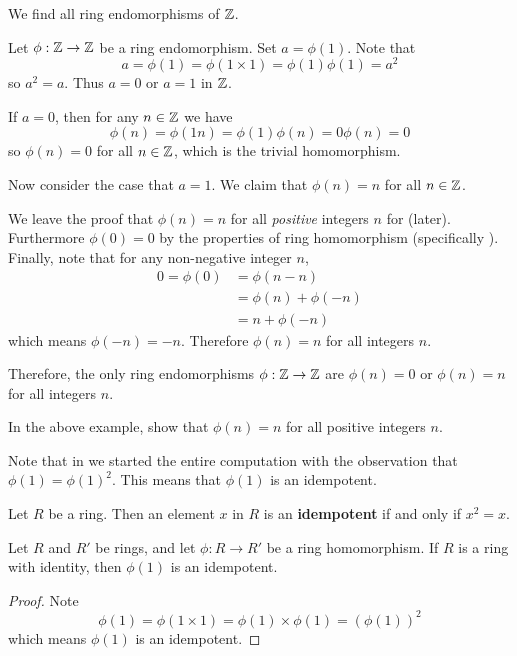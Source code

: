 \begin{example}\label{example-endomorphisms-of-Z}
    We find all ring endomorphisms of $\mathbb{Z}$.

    Let $\phi:\mathbb{Z}\to\mathbb{Z}$ be a ring endomorphism. Set $a = \phi(1)$. Note that
    \[
        a = \phi(1) = \phi(1\times1) = \phi(1)\phi(1) = a^2
    \]
    so $a^2 = a$. Thus $a = 0$ or $a = 1$ in $\mathbb{Z}$.

    If $a = 0$, then for any $n \in \mathbb{Z}$ we have
    \[
        \phi(n) = \phi(1n) = \phi(1)\phi(n) = 0\phi(n) = 0
    \]
    so $\phi(n) = 0$ for all $n \in \mathbb{Z}$, which is the trivial homomorphism.

    Now consider the case that $a = 1$. We claim that $\phi(n) = n$ for all $n \in \mathbb{Z}$.

    We leave the proof that $\phi(n) = n$ for all \textit{positive} integers $n$ for  (later). Furthermore $\phi(0) = 0$ by the properties of ring homomorphism (specifically ). Finally, note that for any non-negative integer $n$,
    \begin{align*}
        0 = \phi(0) &= \phi(n - n)\\
        &= \phi(n) + \phi(-n)\\
        &= n + \phi(-n)
    \end{align*}
    which means $\phi(-n) = -n$. Therefore $\phi(n) = n$ for all integers $n$.

    Therefore, the only ring endomorphisms $\phi:\mathbb{Z}\to\mathbb{Z}$ are $\phi(n) = 0$ or $\phi(n) = n$ for all integers $n$.
\end{example}
\begin{exercise}\label{exercise-homomorphism-maps-n-to-n-if-n-is-positive}
    In the above example, show that $\phi(n) = n$ for all positive integers $n$.
\end{exercise}
Note that in  we started the entire computation with the observation that $\phi(1) = \phi(1)^2$. This means that $\phi(1)$ is an idempotent.
\begin{definition}
    Let $R$ be a ring. Then an element $x$ in $R$ is an \textbf{idempotent} if and only if $x^2 = x$.
\end{definition}
\begin{proposition}\label{prop-homomorphism-on-multiplicative-identity-is-idempotent}
    Let $R$ and $R'$ be rings, and let $\phi: R \to R'$ be a ring homomorphism. If $R$ is a ring with identity, then $\phi(1)$ is an idempotent.
\end{proposition}
\begin{proof}
    Note
    \[
        \phi(1) = \phi(1 \times 1) = \phi(1) \times \phi(1) = \left(\phi(1)\right)^2
    \]
    which means $\phi(1)$ is an idempotent.
\end{proof}

